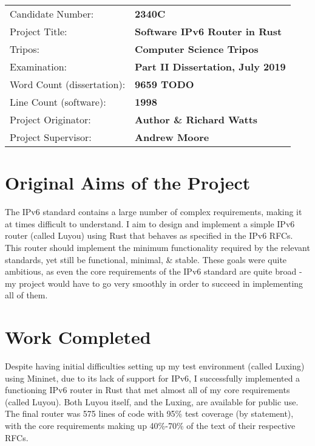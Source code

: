 \documentclass[12pt,a4paper,twoside,openright]{report}
\begin{document}
{\large
\begin{tabular}{ll}
Candidate Number:          & \bf 2340C                      \\
Project Title:             & \bf Software IPv6 Router in Rust \\
Tripos:                    & \bf Computer Science Tripos  \\
Examination:               & \bf Part II Dissertation, July 2019  \\
Word Count (dissertation): & \bf 9659 TODO\footnotemark[1]  \\
Line Count (software):     & \bf 1998 \footnotemark[2] \\
Project Originator:        & \bf Author \& Richard Watts \\
Project Supervisor:        & \bf Andrew Moore \\
\end{tabular}
}


\section*{Original Aims of the Project}

The IPv6 standard\cite{ipv6_rfc} contains a large number of complex requirements, making it at times difficult to understand. I aim to design and implement a simple IPv6 router (called Luyou) using Rust\cite{rust} that behaves as specified in the IPv6 RFCs. This router should implement the minimum functionality required by the relevant standards, yet still be functional, minimal, \& stable.  These goals were quite ambitious, as even the core requirements of the IPv6 standard are quite broad - my project would have to go very smoothly in order to succeed in implementing all of them.

\section*{Work Completed}

Despite having initial difficulties setting up my test environment (called Luxing) using Mininet\cite{mininet}, due to its lack of support for IPv6, I successfully implemented a functioning IPv6 router in Rust that met almost all of my core requirements (called Luyou). Both Luyou itself, and the Luxing, are available for public use.  The final router was 575 lines of code with 95\% test coverage (by statement), with the core requirements making up 40\%-70\% of the text of their respective RFCs. 
\end{document}
